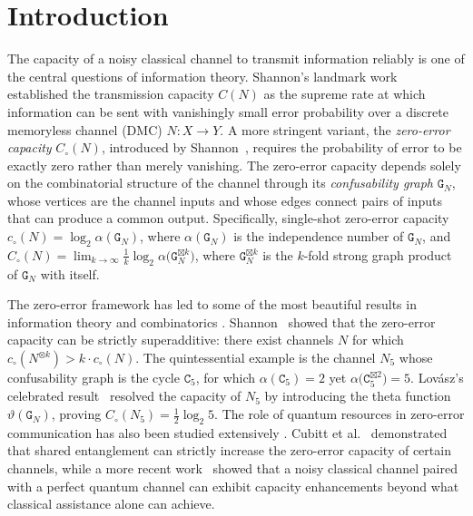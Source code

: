 \documentclass[12pt,a4paper]{article}
\begin{document}
\section{Introduction}\label{sec:intro}

\noindent The capacity of a noisy classical channel to transmit information reliably is one of the central questions of information theory. Shannon's landmark work~\cite{Shannon1948} established the transmission capacity $C(N)$ as the supreme rate at which information can be sent with vanishingly small error probability over a discrete memoryless channel (DMC) $N : X \to Y$. A more stringent variant, the \emph{zero-error capacity} $C_\circ(N)$, introduced by Shannon~\cite{Shannon1956}, requires the probability of error to be exactly zero rather than merely vanishing. The zero-error capacity depends solely on the combinatorial structure of the channel through its \emph{confusability graph} $\mathtt{G}_N$, whose vertices are the channel inputs and whose edges connect pairs of inputs that can produce a common output. Specifically, single-shot zero-error capacity $c_\circ(N) = \log_2\alpha(\mathtt{G}_N)$, where $\alpha(\mathtt{G}_N)$ is the independence number of $\mathtt{G}_N$, and $C_\circ(N) = \lim_{k \to \infty} \frac{1}{k} \log_2 \alpha\big(\mathtt{G}_N^{\boxtimes k}\big)$, where $\mathtt{G}_N^{\boxtimes k}$ is the $k$-fold strong graph product of $\mathtt{G}_N$ with itself.

\noindent The zero-error framework has led to some of the most beautiful results in information theory and combinatorics \cite{Csiszar2015}. Shannon~\cite{Shannon1956} showed that the zero-error capacity can be strictly superadditive: there exist channels $N$ for which $c_\circ(N^{\otimes k}) > k \cdot c_\circ(N)$. The quintessential example is the channel $N_5$ whose confusability graph is the cycle $\mathtt{C}_5$, for which $\alpha(\mathtt{C}_5) = 2$ yet $\alpha\big(\mathtt{C}_5^{\boxtimes 2}\big) = 5$. Lov\'{a}sz's celebrated result~\cite{Lovasz1979} resolved the capacity of $N_5$ by introducing the theta function $\vartheta(\mathtt{G}_N)$, proving $C_\circ(N_5) = \frac{1}{2}\log_2 5$. The role of quantum resources in zero-error communication has also been studied extensively \cite{Guedes2016}. Cubitt et al.~\cite{Cubitt2010} demonstrated that shared entanglement can strictly increase the zero-error capacity of certain channels, while a more recent work~\cite{Ambuj2026} showed that a noisy classical channel paired with a perfect quantum channel can exhibit capacity enhancements beyond what classical assistance alone can achieve.
\end{document}

